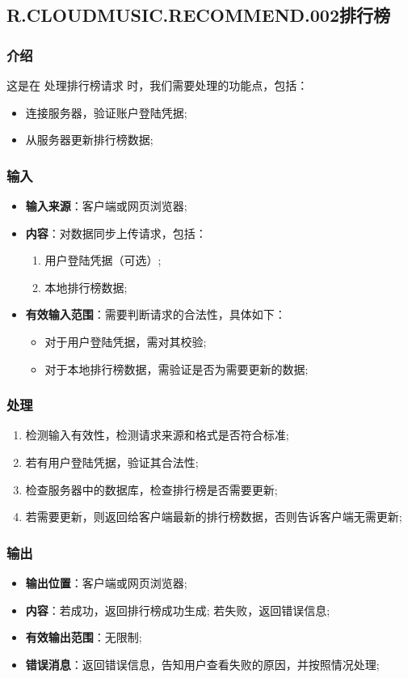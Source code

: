 \subsection{R.CLOUDMUSIC.RECOMMEND.002排行榜}
\subsubsection{介绍}
	这是在 处理排行榜请求 时，我们需要处理的功能点，包括：
	\begin{itemize}
		\item 连接服务器，验证账户登陆凭据;
		\item 从服务器更新排行榜数据;
	\end{itemize}
\subsubsection{输入}
	\begin{itemize}
		\item \textbf{输入来源}：客户端或网页浏览器;
		\item \textbf{内容}：对数据同步上传请求，包括：
		\begin{enumerate}
			\item 用户登陆凭据（可选）;
			\item 本地排行榜数据;
		\end{enumerate}
		\item \textbf{有效输入范围}：需要判断请求的合法性，具体如下：
		\begin{itemize}
			\item 对于用户登陆凭据，需对其校验; 
			\item 对于本地排行榜数据，需验证是否为需要更新的数据; 
		\end{itemize}
	\end{itemize}
\subsubsection{处理}
	\begin{enumerate}
		\item 检测输入有效性，检测请求来源和格式是否符合标准;
		\item 若有用户登陆凭据，验证其合法性;
		\item 检查服务器中的数据库，检查排行榜是否需要更新;
		\item 若需要更新，则返回给客户端最新的排行榜数据，否则告诉客户端无需更新;
	\end{enumerate}
\subsubsection{输出}
\begin{itemize}
	\item \textbf{输出位置}：客户端或网页浏览器;
	\item \textbf{内容}：若成功，返回排行榜成功生成; 若失败，返回错误信息;
	\item \textbf{有效输出范围}：无限制;
	\item \textbf{错误消息}：返回错误信息，告知用户查看失败的原因，并按照情况处理;
\end{itemize}

